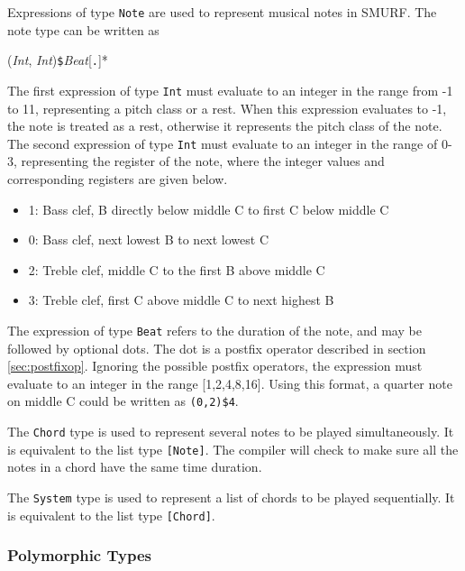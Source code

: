 Expressions of type \texttt{Note} are used to represent musical notes in SMURF.
The note type can be written as

\vspace{1em}
(\emph{Int}, \emph{Int})\texttt{\$}\emph{Beat}[\texttt{.}]* 
\vspace{1em}

The first expression of type \texttt{Int} must evaluate to an integer in the range from -1 to 11,
representing a pitch class or a rest. 
When this expression evaluates to -1, the note is treated as a rest, otherwise it represents the pitch class of 
the note. The second expression of type \texttt{Int} must evaluate to an integer in the range of 0-3,
representing the register of the note, where the integer values and corresponding registers are given below.
\begin{itemize}
    \item 1: Bass clef, B directly below middle C to first C below middle C
    \item 0: Bass clef, next lowest B to next lowest C
    \item 2: Treble clef, middle C to the first B above middle C
    \item 3: Treble clef, first C above middle C to next highest B
\end{itemize}
The expression of type \texttt{Beat} refers to the duration of the note, and may be followed by
optional dots. The dot is a postfix operator described in section \ref{sec:postfixop}. Ignoring the possible
postfix operators, the expression must evaluate to an integer in the range [1,2,4,8,16].
Using this format, a quarter note on middle C could be written as \texttt{(0,2)\$4}.

The \texttt{Chord} type is used to represent several notes to be played simultaneously.
It is equivalent to the list type \texttt{[Note]}.
The compiler will check to make sure all the notes in a chord have the same time duration.

The \texttt{System} type is used to represent a list of chords to be played sequentially.
It is equivalent to the list type \texttt{[Chord]}.

\subsubsection{Polymorphic Types}
\label{sec:polymorphism}

